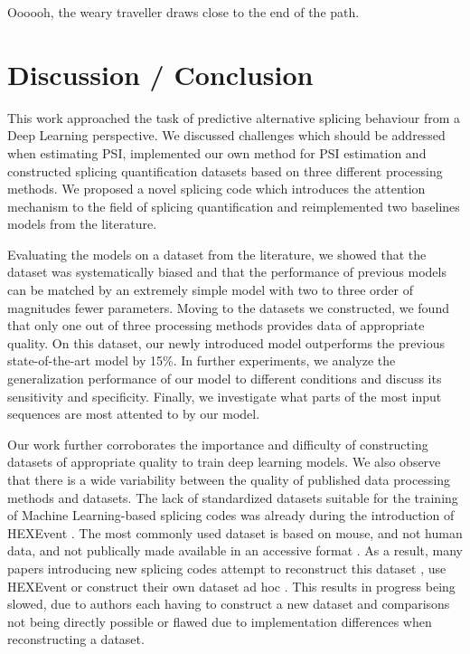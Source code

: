 \begin{savequote}[8cm]
	
	Oooooh, the weary traveller draws close to the end of the path.
\end{savequote}

\chapter{\label{ch:6-conclusion}Discussion / Conclusion} %

This work approached the task of predictive alternative splicing behaviour from a Deep Learning perspective.
We discussed challenges which should be addressed when estimating PSI, implemented our own method for PSI estimation and constructed splicing quantification datasets based on three different processing methods. We proposed a novel splicing code which introduces the attention mechanism to the field of splicing quantification and reimplemented two baselines models from the literature.

Evaluating the models on a dataset from the literature, we showed that the dataset was systematically biased and that the performance of previous models can be matched by an extremely simple model with two to three order of magnitudes fewer parameters. 
Moving to the datasets we constructed, we found that only one out of three processing methods provides data of appropriate quality. On this dataset, our newly introduced model outperforms the previous state-of-the-art model by 15\%. In further experiments, we analyze the generalization performance of our model to different conditions and discuss its sensitivity and specificity. Finally, we investigate what parts of the most input sequences are most attented to by our model.

Our work further corroborates the importance and difficulty of constructing datasets of appropriate quality to train deep learning models. We also observe that there is a wide variability between the quality of published data processing methods and datasets. The lack of standardized datasets suitable for the training of Machine Learning-based splicing codes was already during the introduction of HEXEvent \cite{hexevent}.
The most commonly used dataset is based on mouse, and not human data, and not publically made available in an accessive format \cite{jha}. As a result, many papers introducing new splicing codes attempt to reconstruct this dataset \cite{d2vsplicing}, use HEXEvent \cite{dsc} or construct their own dataset ad hoc \cite{cossmo}. This results in progress being slowed, due to authors each having to construct a new dataset and comparisons not being directly possible or flawed due to implementation differences when reconstructing a dataset. %

